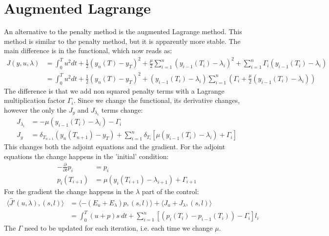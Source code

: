 \documentclass[11pt,a4paper]{article}
\begin{document}
\section*{Augmented Lagrange}
An alternative to the penalty method is the augmented Lagrange method. This method is similar to the penalty method, but it is apparently more stable. The main difference is in the functional, which now reads as:
\begin{align*}
J(y,u,\lambda) &= \int_0^T u^2 dt + \frac{1}{2}(y_n(T)-y_T)^2 + \frac{\mu}{2} \sum_{i=1}^n (y_{i-1}(T_i)-\lambda_i)^2 + \sum_{i=1}^n \Gamma_i(y_{i-1}(T_i)-\lambda_i) \\
&= \int_0^T u^2 dt + \frac{1}{2}(y_n(T)-y_T)^2 +  (y_{i-1}(T_i)-\lambda_i)\sum_{i=1}^n (\Gamma_i+\frac{\mu}{2}(y_{i-1}(T_i)-\lambda_i))
\end{align*}
The difference is that we add non squared penalty terms with a Lagrange multiplication factor $\Gamma_i$. Since we change the functional, its derivative changes, however the only the $J_y$ and $J_{\lambda_i}$ terms change:
\begin{align*}
J_{\lambda_i}&= -\mu(y_{i-1}(T_i)-\lambda_i) -\Gamma_i\\
J_y &= \delta_{T_{n+1}}(y_n(T_{n+1})-y_T) +  \sum_{i=1}^n \delta_{T_{i}}[\mu(y_{i-1}(T_i)-\lambda_i ) + \Gamma_i]
\end{align*}
This changes both the adjoint equations and the gradient. For the adjoint equations the change happens in the 'initial' condition:
\begin{align*}
-\frac{\partial }{\partial t}p_i &=p_i  \\
p_i(T_{i+1}) &= \mu(y_{i}(T_{i+1})-\lambda_{i+1} ) + \Gamma_{i+1}
\end{align*}
For the gradient the change happens in the $\lambda$ part of the control:
\begin{align*}
\langle \hat{J}'(u,\lambda), (s,l)\rangle&=\langle -(E_u+E_{\lambda})p, (s,l)\rangle + \langle J_u+J_{\lambda}, (s,l)\rangle \\
&= \int_0^T (u+p)s \ dt +\sum_{i=1}^n[(p_{i}(T_i) -p_{i-1}(T_i) )- \Gamma_i]l_i
\end{align*}
The $\Gamma$ need to be updated for each iteration, i.e. each time we change $\mu$.
\newpage
{}
\end{document}
